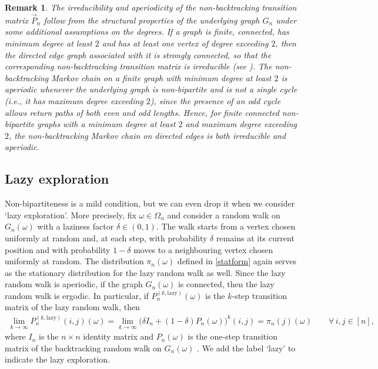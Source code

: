 \documentclass[11pt]{article}
\numberwithin{equation}{section}
\theoremstyle{plain}
\newtheorem{remark}[theorem]{Remark}
\begin{document}
\begin{remark}
\rm{The irreducibility and aperiodicity of the non-backtracking transition matrix $\vec{P}_n$ follow from the structural properties of the underlying graph $G_n$ under some additional assumptions on the degrees. If a graph is finite, connected, has minimum degree at least $2$ and has at least one vertex of degree exceeding $2$, then the directed edge graph associated with it is strongly connected, so that the corresponding non-backtracking transition matrix is irreducible (see \cite[Claim~4]{EH}). The non-backtracking Markov chain on a finite graph with minimum degree at least $2$ is aperiodic whenever the underlying graph is non-bipartite and is not a single cycle (i.e., it has maximum degree exceeding $2$), since the presence of an odd cycle allows return paths of both even and odd lengths. Hence, for finite connected non-bipartite graphs with a minimum degree at least $2$ and maximum degree exceeding $2$, the non-backtracking Markov chain on directed edges is both irreducible and aperiodic.}
\end{remark}




\subsection{Lazy exploration}
\label{subsec:lazy}
Non-bipartiteness is a mild condition, but we can even drop it when we consider `lazy exploration'. More precisely, fix $\omega\in\Omega_{n}$ and consider a random walk on $G_{n}(\omega)$ with a laziness factor $\delta \in (0,1)$. The walk starts from a vertex chosen uniformly at random and, at each step, with probability $\delta$ remains at its current position and with probability $1-\delta$ moves to a neighbouring vertex chosen uniformly at random. The distribution $\pi_{n}(\omega)$ defined in \eqref{statform} again serves as the stationary distribution for the lazy random walk as well. Since the lazy random walk is aperiodic, if the graph $G_{n}(\omega)$ is connected, then the lazy random walk is ergodic. In particular, if $P_{n}^{(k,\mathrm{lazy})}(\omega)$ is the $k$-step transition matrix of the lazy random walk, then
\begin{align*} 
\lim_{k \rightarrow \infty} P_{n}^{(k,\mathrm{lazy})}(i,j)(\omega) 
= \lim_{k \rightarrow \infty} \Big(\delta I_{n} + (1 - \delta) P_{n}(\omega)\Big)^{k}(i,j) = \pi_{n}(j)(\omega) \qquad \forall\,i, j \in [n],
\end{align*}
where $I_{n}$ is the $n \times n$ identity matrix and $P_{n}(\omega)$ is the one-step transition matrix of the backtracking random walk on $G_{n}(\omega)$ \cite[Theorem 1.8.3]{N}. We add the label `lazy' to indicate the lazy exploration. 
\end{document}
